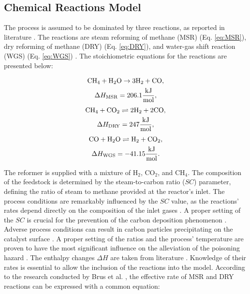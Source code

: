 \documentclass[preprint,12pt]{elsarticle}
\begin{document}
\subsection{Chemical Reactions Model}
\label{subsec:math_model_ref}

The process is assumed to be dominated by three reactions, as reported in literature \cite{Xu1989, Komatsu2009, Mozdzierz2018}. The reactions are steam reforming of methane (MSR) (Eq. \eqref{eq:MSR}), dry reforming of methane (DRY) (Eq. \eqref{eq:DRY}), and water-gas shift reaction (WGS) (Eq. \eqref{eq:WGS}) \cite{Brus2015}. The stoichiometric equations for the reactions are presented below: 

\begin{multline}
\label{eq:MSR}
\hfill \rm{CH_{4}+H_2O \rightarrow	3H_2+CO}, \hfill\\
{\Delta H_{\rm{MSR}} = 206.1 \rm{\frac{kJ}{mol}},}
\end{multline}
\begin{multline}
\label{eq:DRY}
\hfill \rm{CH_4+CO_2 \rightleftharpoons 2H_2+2CO}, \hfill\\
{\Delta H_{\rm{DRY}} = 247 \rm{\frac{kJ}{mol}},}
\end{multline}
\begin{multline}
\label{eq:WGS}
\hfill \rm{CO+H_2O \rightleftharpoons H_2+CO_2}, \hfill\\
{\Delta H_{\rm{WGS}} = -41.15 \rm{\frac{kJ}{mol}}.}
\end{multline}

The reformer is supplied with a mixture of H$_2$, CO$_2$, and CH$_4$. The composition of the feedstock is determined by the steam-to-carbon ratio ($SC$) parameter, defining the ratio of steam to methane provided at the reactor's inlet. The process conditions are remarkably influenced by the $SC$ value, as the reactions' rates depend directly on the composition of the inlet gases \cite{Usman2015}. A proper setting of the $SC$ is crucial for the prevention of the carbon deposition phenomenon \cite{Koncewicz2021}. Adverse process conditions can result in carbon particles precipitating on the catalyst surface \cite{Kaczmarczyk2021}. A proper setting of the ratios and the process' temperature are proven to have the most significant influence on the alleviation of the poisoning hazard \cite{Tomiczek2017}. The enthalpy changes $\Delta H$ are taken from literature \cite{Pajak2018, Mazhar2021}. Knowledge of their rates is essential to allow the inclusion of the reactions into the model. According to the research conducted by Brus et al. \cite{Brus2012}, the effective rate of MSR and DRY reactions can be expressed with a common equation:
\end{document}
